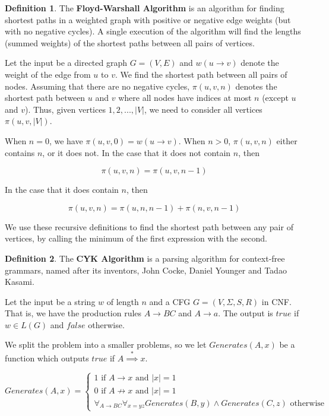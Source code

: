 \documentclass[11pt]{article}
\theoremstyle{plain} %
\theoremstyle{definition}
\newtheorem*{definition}{Definition} %
\theoremstyle{example}
\theoremstyle{remark}
\begin{document}
\begin{definition}
The \textbf{Floyd-Warshall Algorithm}  is an algorithm for finding shortest paths in a weighted graph with positive or negative edge weights (but with no negative cycles). A single execution of the algorithm will find the lengths (summed weights) of the shortest paths between all pairs of vertices. 


Let the input be a directed graph $G=(V,E)$ and $w(u \rightarrow v)$ denote the weight of the edge from $u$ to $v$. We find the shortest path between all pairs of nodes. Assuming that there are no negative cycles, $\pi(u,v,n)$ denotes the shortest path between $u$ and $v$ where all nodes have indices at most $n$ (except $u$ and $v$). Thus, given vertices $1, 2, ..., |V|$, we need to consider all vertices $\pi(u,v,|V|)$. 

When $n=0$, we have $\pi(u,v,0) = w(u \rightarrow v)$. When $n > 0$, $\pi(u,v,n)$ either contains $n$, or it does not. In the case that it does not contain $n$, then 

$$\pi(u,v,n) = \pi(u,v,n-1)$$

In the case that it does contain $n$, then

$$\pi(u,v,n) = \pi(u,n,n-1) + \pi(n,v,n-1)$$

We use these recursive definitions to find the shortest path between any pair of vertices, by calling the minimum of the first expression with the second. 

\end{definition}

\begin{definition}
The \textbf{CYK Algorithm} is a parsing algorithm for context-free grammars, named after its inventors, John Cocke, Daniel Younger and Tadao Kasami.

Let the input be a string $w$ of length $n$ and a CFG $G=(V, \Sigma, S,R)$ in CNF. That is, we have the production rules $A \rightarrow BC$ and $A \rightarrow a$. The output is $true$ if $w \in L(G)$ and $false$ otherwise. 

We split the problem into a smaller problems, so we let $Generates(A,x)$  be a function which outputs $true$ if $A \overset{*}{\implies} x$.

$$Generates(A,x) = \begin{cases}
	1 \text{ if } A \rightarrow x \text{ and } |x|=1\\
	0 \text{ if } A \not\rightarrow x \text{ and } |x|=1\\
	\forall_{A\rightarrow BC} \forall_{x=yz} Generates(B,y) \land Generates(C,z) \text{ otherwise}
\end{cases}$$
\end{definition}
\end{document}
